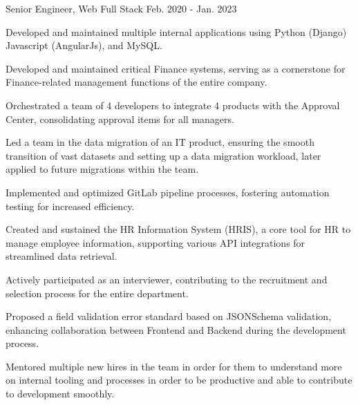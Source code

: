 \begin{cventries}
  \cventry
    {Senior Engineer, Web Full Stack} %
    {} %
    {} %
    {Feb. 2020 - Jan. 2023} %
    {
      \begin{cvitems} %
        \item {Developed and maintained multiple internal applications using Python (Django) Javascript (AngularJs), and MySQL.}
        \item {Developed and maintained critical Finance systems, serving as a cornerstone for Finance-related management functions of the entire company.}
        \item {Orchestrated a team of 4 developers to integrate 4 products with the Approval Center, consolidating approval items for all managers.}
        \item {Led a team in the data migration of an IT product, ensuring the smooth transition of vast datasets and setting up a data migration workload, later applied to future migrations within the team.}
        \item {Implemented and optimized GitLab pipeline processes, fostering automation testing for increased efficiency.}
        \item {Created and sustained the HR Information System (HRIS), a core tool for HR to manage employee information, supporting various API integrations for streamlined data retrieval.}
        \item {Actively participated as an interviewer, contributing to the recruitment and selection process for the entire department.}
        \item {Proposed a field validation error standard based on JSONSchema validation, enhancing collaboration between Frontend and Backend during the development process.}
        \item {Mentored multiple new hires in the team in order for them to understand more on internal tooling and processes in order to be productive and able to contribute to development smoothly.}
      \end{cvitems}
    }


\end{cventries}
